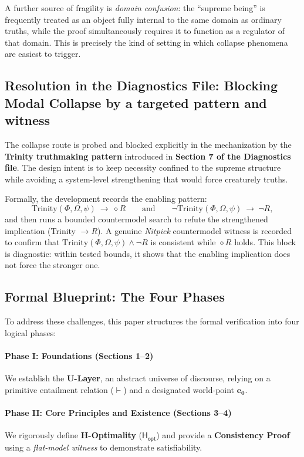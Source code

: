 \documentclass[a4paper, 11pt]{article}
\theoremstyle{plain}
\theoremstyle{definition}
\newcommand{\Hopt}{\mathsf{H_{opt}}}       %
\newcommand{\eZero}{\mathbf{e_0}}         %
\begin{document}
A further source of fragility is \emph{domain confusion}: the ``supreme being'' is frequently treated as an object fully internal to the same domain as ordinary truths, while the proof simultaneously requires it to function as a regulator of that domain. This is precisely the kind of setting in which collapse phenomena are easiest to trigger.

\subsection{Resolution in the Diagnostics File: Blocking Modal Collapse by a targeted pattern and witness}
The collapse route is probed and blocked explicitly in the mechanization by the \textbf{Trinity truthmaking pattern} introduced in \textbf{Section 7 of the Diagnostics file}. The design intent is to keep necessity confined to the supreme structure while avoiding a system-level strengthening that would force creaturely truths.

Formally, the development records the enabling pattern:
\[
\text{Trinity}(\Phi,\Omega,\psi)\ \longrightarrow\ \diamond R
\qquad\text{and}\qquad
\neg\text{Trinity}(\Phi,\Omega,\psi)\ \longrightarrow\ \neg R,
\]
and then runs a bounded countermodel search to refute the strengthened implication (Trinity $\rightarrow R$). A genuine \textit{Nitpick} countermodel witness is recorded to confirm that $\text{Trinity}(\Phi,\Omega,\psi)\land \neg R$ is consistent while $\diamond R$ holds.
This block is diagnostic: within tested bounds, it shows that the enabling implication does not force the stronger one.

\subsection{Formal Blueprint: The Four Phases}
To address these challenges, this paper structures the formal verification into four logical phases:

\paragraph{Phase I: Foundations (Sections 1--2)} We establish the \textbf{U-Layer}, an abstract universe of discourse, relying on a primitive entailment relation ($\vdash$) and a designated world-point $\eZero$.

\paragraph{Phase II: Core Principles and Existence (Sections 3--4)} We rigorously define \textbf{H-Optimality} ($\Hopt$) and provide a \textbf{Consistency Proof} using a \textit{flat-model witness} to demonstrate satisfiability.
\end{document}
